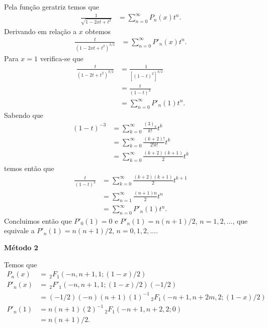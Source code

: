 \documentclass[a4paper,12pt, leqno, answers]{exam}
\begin{document}
\begin{questions}
\begin{parts}
\begin{solution}
            Pela fun\c{c}\~{a}o geratriz temos que
            \begin{align*}
                \frac{1}{\sqrt{1 - 2 x t + t^2}} &= \sum_{n = 0}^\infty P_n(x) t^n.
            \end{align*}
            Derivando em rela\c{c}\~{a}o a $x$ obtemos
            \begin{align*}
                \frac{t}{\left( 1 - 2 x t + t^2 \right)^{3/2}} &= \sum_{n = 0}^\infty P'_n(x) t^n.
            \end{align*}
            Para $x = 1$ verifica-se que
            \begin{align*}
                \frac{t}{\left( 1 - 2 t + t^2 \right)^{3/2}} &= \frac{1}{\left[ \left( 1 - t \right)^2 \right]^{3/2}} \\
                &= \frac{t}{\left( 1 - t \right)^3} \\
                &= \sum_{n = 0}^\infty P'_n(1) t^n.
            \end{align*}
            Sabendo que
            \begin{align*}
                \left( 1 - t \right)^{-3} &= \sum_{k = 0}^\infty \frac{(3)_k}{k!} t^k \\
                &= \sum_{k = 0}^\infty \frac{(k + 2)!}{2! k!} t^k \\
                &= \sum_{k = 0}^\infty \frac{(k + 2) (k + 1)}{2} t^k
            \end{align*}
            temos ent\~{a}o que
            \begin{align*}
                \frac{t}{\left( 1 - t \right)^3} &= \sum_{k = 0}^\infty \frac{(k + 2) (k + 1)}{2} t^{k + 1} \\
                &= \sum_{n = 1}^\infty \frac{(n + 1) n}{2} t^n \\
                &= \sum_{n = 0}^\infty P'_n(1) t^n.
            \end{align*}
            Concluimos ent\~{a}o que $P'_0(1) = 0$ e $P'_n(1) = n \left( n + 1 \right) / 2$, $n = 1, 2, \ldots$, que equivale a $P'_n(1) = n \left( n + 1 \right) / 2$, $n = 0, 1, 2, \ldots$.

            \textbf{M\'{e}todo 2}

            Temos que
            \begin{align*}
                P_n(x) &= \,_2F_1(-n, n + 1, 1; (1 - x)/2) \\
                P'_n(x) &= \,_2F'_1(-n, n + 1, 1; (1 - x)/2) \left( -1 / 2 \right)\\
                &= \left( -1 / 2 \right) ( -n ) ( n + 1 ) ( 1 )^{-1} \,_2F_1(-n + 1, n + 2m, 2; (1 - x)/2) \\
                P'_n(1) &= n (n + 1) (2)^{-1} \,_2F_1(-n + 1, n + 2, 2; 0) \\
                &= n (n + 1) / 2.
            \end{align*}
        \end{solution}


\end{parts}
\end{questions}
\end{document}
